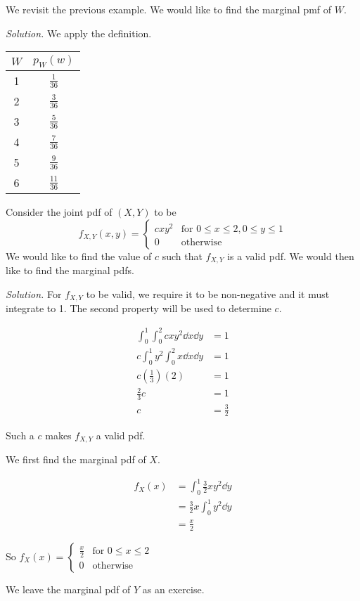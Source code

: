\begin{example}[]
	We revisit the previous example. We would like to find the marginal pmf of $W$.

	\textit{Solution.} We apply the definition.
	\begin{center}
	\begin{tabular}{c | c}
		$W$ & $p_W(w)$\\ \hline
		1 & $\frac{1}{36}$\\
		2 & $\frac{3}{36}$\\
		3 & $\frac{5}{36}$\\
		4 & $\frac{7}{36}$\\
		5 & $\frac{9}{36}$\\
		6 & $\frac{11}{36}$
	\end{tabular}
	\end{center}
\end{example}


\begin{example}[]
	Consider the joint pdf of $(X,Y)$ to be
	$$f_{X,Y}(x,y)=\begin{cases}
		cxy^2 & \text{for $0\leq x\leq 2,0\leq y\leq 1$}\\
		0 & \text{otherwise}
	\end{cases}$$
	We would like to find the value of $c$ such that $f_{X,Y}$ is a valid pdf. We would then like to find the marginal pdfs.

	\textit{Solution.} For $f_{X,Y}$ to be valid, we require it to be non-negative and it must integrate to 1. The second property will be used to determine $c$.

	\begin{align*}
		\int_0^1\int_0^2 cxy^2\dd x\dd y & =1\\
		c\int_0^1y^2\int_0^2 x\dd x\dd y & =1\\
		c\left(\frac 13\right)(2)&=1\\
		\frac 23 c&=1\\
		c&=\frac 32
	\end{align*}

	Such a $c$ makes $f_{X,Y}$ a valid pdf.

	We first find the marginal pdf of $X$.

	\begin{align*}
		f_X(x)&=\int_0^1\frac 32xy^2\dd y\\
		&=\frac 32x\int_0^1y^2\dd y\\
		&=\frac x2
	\end{align*}

	So $f_X(x)=\begin{cases}
		\frac x 2 & \text{for $0\leq x\leq 2$}\\
		0 & \text{otherwise}
	\end{cases}$

	We leave the marginal pdf of $Y$ as an exercise.
\end{example}

